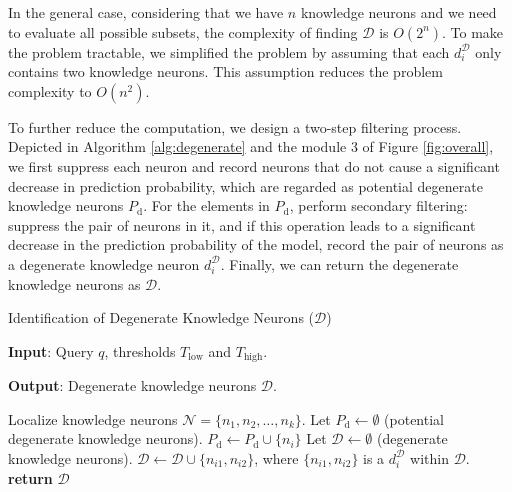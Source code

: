 \documentclass[]{article}
\begin{document}
In the general case, considering that we have \(n\) knowledge neurons and we need to evaluate all possible subsets, the complexity of finding \(\mathcal{D}\) is \(O(2^n)\). To make the problem tractable, we simplified the problem by assuming that each \( d^{\mathcal{D}}_i \) only contains two knowledge neurons. This assumption reduces the problem complexity to \(O(n^2)\).

To further reduce the computation, we design a two-step filtering process. Depicted in Algorithm \ref{alg:degenerate} and the module 3 of Figure \ref{fig:overall}, we first suppress each neuron and record neurons that do not cause a significant decrease in prediction probability, which are regarded as potential degenerate knowledge neurons $P_{\text{d}}$. For the elements in $P_{\text{d}}$, perform secondary filtering: suppress the pair of neurons in it, and if this operation leads to a significant decrease in the prediction probability of the model, record the pair of neurons as a degenerate knowledge neuron $d_i^{\mathcal{D}}$. Finally, we can return the degenerate knowledge neurons as \(\mathcal{D}\).
\begin{algorithm}[tb]
\caption{Identification of Degenerate Knowledge Neurons ($\mathcal{D}$)}
\label{alg:degenerate}
\textbf{Input}: Query $q$, thresholds $T_{\text{low}}$ and $T_{\text{high}}$.

\textbf{Output}: Degenerate knowledge neurons $\mathcal{D}$.

\begin{algorithmic}[1] %
\STATE Localize knowledge neurons \(\mathcal{N}=\{n_1, n_2, \ldots, n_k\}\).
\STATE Let \(P_{\text{d}} \leftarrow \emptyset\) (potential degenerate knowledge neurons).
\STATE \(P_{\text{d}} \leftarrow P_{\text{d}} \cup \{n_i\}\)
\ENDIF
\ENDFOR
\STATE Let \(\mathcal{D} \leftarrow \emptyset\) (degenerate knowledge neurons).
\STATE \(\mathcal{D} \leftarrow \mathcal{D} \cup \{n_{i1}, n_{i2}\}\),
where $\{n_{i1}, n_{i2}\}$ is a $d_{i}^{\mathcal{D}}$ within \(\mathcal{D}\).
\ENDIF
\ENDFOR
\STATE \textbf{return} \(\mathcal{D}\)
\end{algorithmic}
\end{algorithm}
\end{document}
